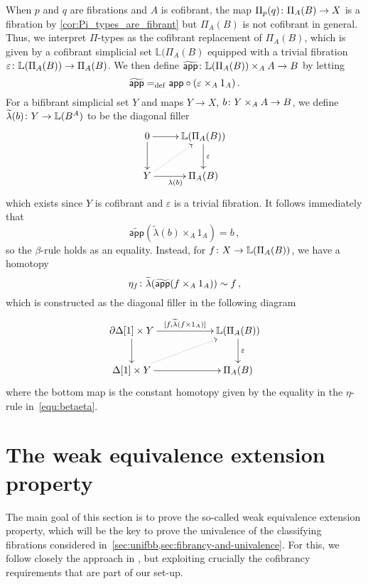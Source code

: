 \documentclass[reqno,10pt,a4paper,oneside,draft]{amsart}
\begin{document}
\begin{remark}
 When $p$ and $q$ are fibrations and $A$ is cofibrant, the map 
 $\Pi_p(q) \colon \Pi_A(B) \to X$ is a fibration by \cref{cor:Pi_types_are_fibrant} but $\Pi_A(B)$ is not cofibrant
 in general. Thus, we interpret  $\Pi$-types as the 
 cofibrant replacement  of $\Pi_A(B)$, which is given by a cofibrant simplicial set
 $\mathbb{L}(\Pi_A(B)$  equipped with
 a trivial fibration $\varepsilon \colon \mathbb{L}(\Pi_A(B)) \to \Pi_A(B)$. 
We then define $\widetilde{\mathsf{app}} \colon   \mathbb{L}(\Pi_A(B)) \times_A A \to B$ by letting
\[
\widetilde{\mathsf{app}}  =_{\operatorname{def}} \mathsf{app} \circ (\varepsilon \times_A 1_A) \, .
\]
For a bifibrant simplicial set $Y$ and maps $Y \to X$,  $b \colon Y \times_A A \to B$, we define $\widetilde{\lambda}(b) \colon Y \to \mathbb{L}(B^A)$ to be the
diagonal filler
\[
\xymatrix{
0 \ar[r] \ar[d] & \mathbb{L}(\Pi_A(B))  \ar[d]^\varepsilon \\
Y \ar[r]_{\lambda(b)} \ar@{.>}[ur] & \Pi_A(B)}
\]
which exists since $Y$ is cofibrant and $\varepsilon$ is a trivial fibration. It follows immediately that
\[
 \widetilde{\mathsf{app}}(\widetilde{\lambda}(b) \times_A 1_A) = b \, ,
\]
so the $\beta$-rule holds as an equality. Instead, for $f \colon X \to \mathbb{L}(\Pi_A(B))$, we have a homotopy
\[
\eta_f  \colon \widetilde{\lambda}( \widetilde{\mathsf{app}}(f \times_A 1_A)) \sim  f  \, ,
\]
which is constructed as the diagonal filler in the following diagram
\[
\xymatrix@C=2cm{
\partial \Delta[1] \times Y \ar[r]^-{[f, \widetilde{\lambda}(f \times 1_A)]} \ar[d] & \mathbb{L}(\Pi_A(B)) \ar[d]^\varepsilon \\
\Delta[1] \times Y \ar[r] \ar@{.>}[ur] & \Pi_A(B) }
\]
where the bottom map is the constant homotopy given by the equality in the $\eta$-rule in~\eqref{equ:betaeta}.
\end{remark}



\section{The weak equivalence extension property}
\label{sec:equep}

The main goal of this section is to prove the so-called weak equivalence extension property, which will be the key to prove the univalence of the classifying fibrations considered in~\cref{sec:unifbb,sec:fibrancy-and-univalence}.  For this, we follow closely the approach in \cite{voevodsky-simplicial-model}, but exploiting crucially the cofibrancy requirements that are part of our set-up.
\end{document}
